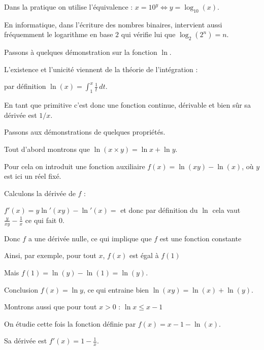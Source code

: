 Dans la pratique on utilise l'équivalence : $x=10^y \iff y = \log_{10}(x)$.

\change

En informatique, dans l'écriture des nombres binaires, intervient aussi fréquemment 
le logarithme en base $2$ qui vérifie lui que $\log_2(2^n)=n$.


\diapo


Passons à quelques démonstration sur la fonction $\ln$.

L'existence et l'unicité viennent de la théorie de l'intégration :  

par définition $\ln(x) = \int_1^x \frac1t \, dt$.

En tant que primitive c'est donc une fonction continue, dérivable et bien sûr 
sa dérivée est $1/x$.


  
\change

Passons aux démonstrations de quelques propriétés.

Tout d'abord montrons que $\ln(x \times y)=\ln x + \ln y$.

\change

Pour cela on introduit une fonction auxiliaire
$f(x)=\ln(xy)-\ln(x)$, où $y$ est ici un réel fixé. 

\change

Calculons la dérivée de $f$ :

   $f'(x)=y\ln'(xy)-\ln'(x)=$ et donc par définition du $\ln$ cela vaut $\frac{y}{xy}-\frac1x$ ce qui fait $0$.
   
\change


  Donc $f$ a une dérivée nulle,  ce qui implique que $f$ est une fonction constante 
 
\change

Ainsi, par exemple, pour tout $x$, $f(x)$ est égal à $f(1)$
 
 Mais $f(1) = \ln(y)-\ln(1)=\ln(y)$. 
 
 
 \change 
 
 Conclusion $f(x)=\ln y$, ce qui entraine bien   $\ln(xy)=\ln(x)+\ln(y)$.
 
 
\change

Montrons aussi que pour tout $x>0$ : $\ln x \le x-1$

\change

On étudie cette fois la fonction définie par 
$f(x)=x-1-\ln(x)$. 

\change

Sa dérivée est $f'(x)= 1 -\frac1x$.

